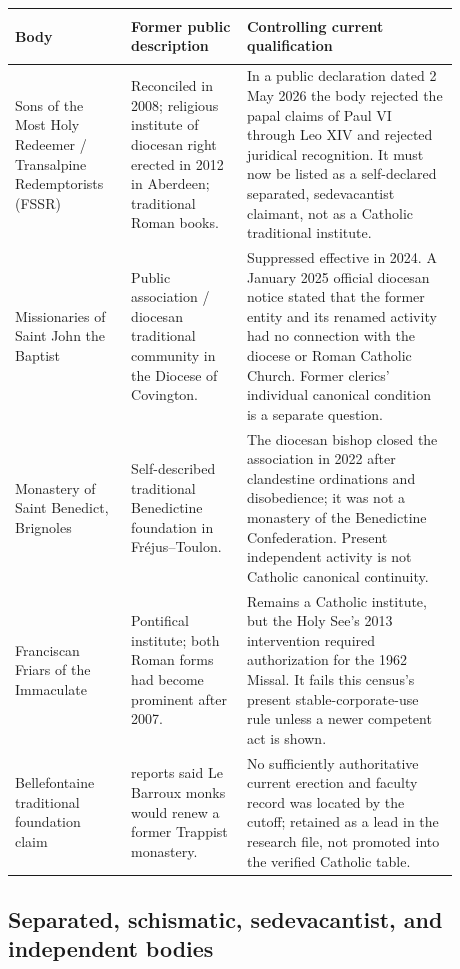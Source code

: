 \begin{longtable}{>{\bfseries\raggedright\arraybackslash}p{0.23\linewidth}>{\raggedright\arraybackslash}p{0.23\linewidth}>{\raggedright\arraybackslash}p{0.42\linewidth}}
\toprule
\textbf{Body} & \textbf{Former public description} & \textbf{Controlling current qualification}\\
\midrule
\endhead
Sons of the Most Holy Redeemer / Transalpine Redemptorists (FSSR) & Reconciled in 2008; religious institute of diocesan right erected in 2012 in Aberdeen; traditional Roman books. & In a public declaration dated 2 May 2026 the body rejected the papal claims of Paul VI through Leo XIV and rejected juridical recognition. It must now be listed as a self-declared separated, sedevacantist claimant, not as a Catholic traditional institute.\\
Missionaries of Saint John the Baptist & Public association / diocesan traditional community in the Diocese of Covington. & Suppressed effective in 2024. A January 2025 official diocesan notice stated that the former entity and its renamed activity had no connection with the diocese or Roman Catholic Church. Former clerics' individual canonical condition is a separate question.\\
Monastery of Saint Benedict, Brignoles & Self-described traditional Benedictine foundation in Fréjus--Toulon. & The diocesan bishop closed the association in 2022 after clandestine ordinations and disobedience; it was not a monastery of the Benedictine Confederation. Present independent activity is not Catholic canonical continuity.\\
Franciscan Friars of the Immaculate & Pontifical institute; both Roman forms had become prominent after 2007. & Remains a Catholic institute, but the Holy See's 2013 intervention required authorization for the 1962 Missal. It fails this census's present stable-corporate-use rule unless a newer competent act is shown.\\
Bellefontaine traditional foundation claim & 2025 reports said Le Barroux monks would renew a former Trappist monastery. & No sufficiently authoritative current erection and faculty record was located by the cutoff; retained as a lead in the research file, not promoted into the verified Catholic table.\\
\bottomrule
\end{longtable}

\subsection{Separated, schismatic, sedevacantist, and independent bodies}

